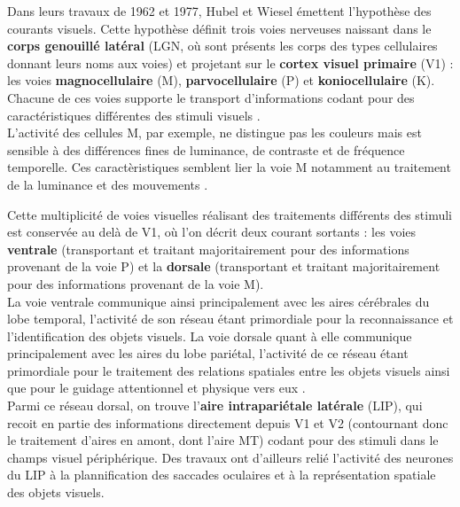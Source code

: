 Dans leurs travaux de 1962 et 1977, Hubel et Wiesel émettent l'hypothèse des courants visuels. Cette hypothèse définit trois voies nerveuses naissant dans le \textbf{corps genouillé latéral} (LGN, où sont présents les corps des types cellulaires donnant leurs noms aux voies) et projetant sur le \textbf{cortex visuel primaire} (V1) :  les voies \textbf{magnocellulaire} (M),  \textbf{parvocellulaire} (P) et  \textbf{koniocellulaire} (K). Chacune de ces voies supporte le transport d'informations codant pour des caractéristiques différentes des stimuli visuels \autocite{Denison2014, Werner2014}.\\
L'activité des cellules M, par exemple, ne distingue pas les couleurs mais est sensible à des différences fines de luminance, de contraste et de fréquence temporelle. Ces caractèristiques semblent lier la voie M notamment au traitement de la luminance et des mouvements \autocite{Denison2014, Werner2014}.

Cette multiplicité de voies visuelles réalisant des traitements différents des stimuli est conservée au delà de V1, où l'on décrit deux courant sortants : les voies \textbf{ventrale} (transportant et traitant majoritairement pour des informations provenant de la voie P) et la \textbf{dorsale} (transportant et traitant majoritairement pour des informations provenant de la voie M)\autocite{Werner2014, Freeman2011}.\\
La voie ventrale communique ainsi principalement avec les aires cérébrales du lobe temporal, l'activité de son réseau étant primordiale pour la reconnaissance et l'identification des objets visuels. La voie dorsale quant à elle communique principalement avec les aires du lobe pariétal, l'activité de ce réseau étant primordiale pour le traitement des relations spatiales entre les objets visuels ainsi que pour le guidage attentionnel et physique vers eux \autocite{Werner2014, Freeman2011}.\\
Parmi ce réseau dorsal, on trouve l'\textbf{aire intrapariétale latérale} (LIP), qui recoit en partie des informations directement depuis V1 et V2 (contournant donc le traitement d'aires en amont, dont l'aire MT) codant pour des stimuli dans le champs visuel périphérique. Des travaux ont d'ailleurs relié l'activité des neurones du LIP à la plannification des saccades oculaires et à la représentation spatiale des objets visuels.


